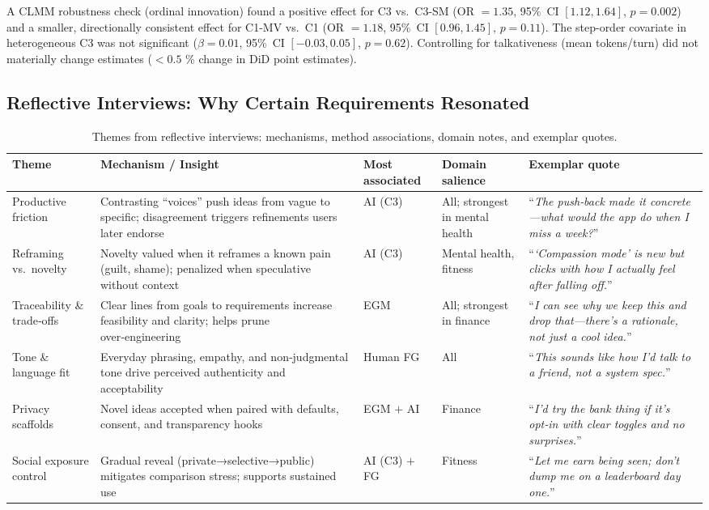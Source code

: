 \documentclass[acmsmall]{acmart}
\begin{document}
A CLMM robustness check (ordinal innovation) found a positive effect for C3 vs.\ C3-SM (OR \(=1.35\), 95\%~CI \([1.12,1.64]\), \(p{=}0.002\)) and a smaller, directionally consistent effect for C1-MV vs.\ C1 (OR \(=1.18\), 95\%~CI \([0.96,1.45]\), \(p{=}0.11\)). The step-order covariate in heterogeneous C3 was not significant (\(\beta{=}0.01\), 95\%~CI \([-0.03,0.05]\), \(p{=}0.62\)). Controlling for talkativeness (mean tokens/turn) did not materially change estimates (\(<0.5\) \% change in DiD point estimates).


\subsection{Reflective Interviews: Why Certain Requirements Resonated}
\label{sec:results-reflective}
\begin{table}[t]
  \centering
  \caption{Themes from reflective interviews: mechanisms, method associations, domain notes, and exemplar quotes.}
  \label{tab:reflective-themes}
  \small
  \setlength{\tabcolsep}{4pt}
  \begin{tabularx}{\columnwidth}{@{}p{2.2cm} >{\raggedright\arraybackslash}X p{1.5cm} p{2.2cm} >{\raggedright\arraybackslash}X@{}}
    \toprule
    \textbf{Theme} & \textbf{Mechanism / Insight} & \textbf{Most associated} & \textbf{Domain salience} & \textbf{Exemplar quote} \\
    \midrule
    Productive friction & Contrasting “voices” push ideas from vague to specific; disagreement triggers refinements users later endorse & AI (C3) & All; strongest in mental health & “\emph{The push‑back made it concrete—what would the app do when I miss a week?}” \\
    \addlinespace[2pt]
    Reframing vs.\ novelty & Novelty valued when it reframes a known pain (guilt, shame); penalized when speculative without context & AI (C3) & Mental health, fitness & “\emph{‘Compassion mode’ is new but clicks with how I actually feel after falling off.}” \\
    \addlinespace[2pt]
    Traceability \& trade‑offs & Clear lines from goals to requirements increase feasibility and clarity; helps prune over‑engineering & EGM & All; strongest in finance & “\emph{I can see why we keep this and drop that—there’s a rationale, not just a cool idea.}” \\
    \addlinespace[2pt]
    Tone \& language fit & Everyday phrasing, empathy, and non‑judgmental tone drive perceived authenticity and acceptability & Human FG & All & “\emph{This sounds like how I’d talk to a friend, not a system spec.}” \\
    \addlinespace[2pt]
    Privacy scaffolds & Novel ideas accepted when paired with defaults, consent, and transparency hooks & EGM $+$ AI & Finance & “\emph{I’d try the bank thing if it’s opt‑in with clear toggles and no surprises.}” \\
    \addlinespace[2pt]
    Social exposure control & Gradual reveal (private→selective→public) mitigates comparison stress; supports sustained use & AI (C3) $+$ FG & Fitness & “\emph{Let me earn being seen; don’t dump me on a leaderboard day one.}” \\
    \bottomrule
  \end{tabularx}
\end{table}
\end{document}
